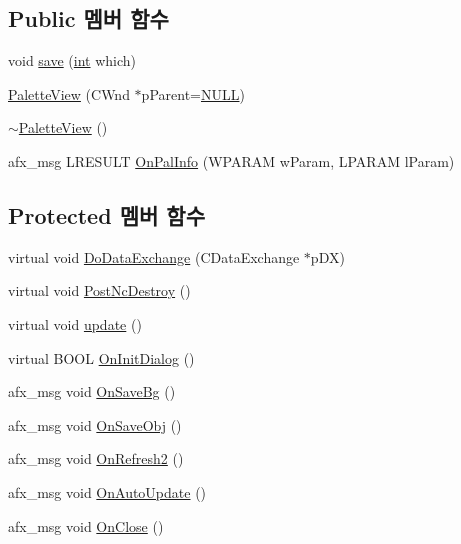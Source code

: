 \subsection*{Public 멤버 함수}
\begin{DoxyCompactItemize}
\item 
void \mbox{\hyperlink{class_palette_view_a107b71060221c9d44bdf0d38ca77c689}{save}} (\mbox{\hyperlink{_util_8cpp_a0ef32aa8672df19503a49fab2d0c8071}{int}} which)
\item 
\mbox{\hyperlink{class_palette_view_afee218ccd679f4feecc362a8c2763729}{Palette\+View}} (C\+Wnd $\ast$p\+Parent=\mbox{\hyperlink{_system_8h_a070d2ce7b6bb7e5c05602aa8c308d0c4}{N\+U\+LL}})
\item 
\mbox{\hyperlink{class_palette_view_a8b61805ccbde12bb0494801ec2b54c69}{$\sim$\+Palette\+View}} ()
\item 
afx\+\_\+msg L\+R\+E\+S\+U\+LT \mbox{\hyperlink{class_palette_view_a458786a4c3317411b5cd818c544ea50a}{On\+Pal\+Info}} (W\+P\+A\+R\+AM w\+Param, L\+P\+A\+R\+AM l\+Param)
\end{DoxyCompactItemize}
\subsection*{Protected 멤버 함수}
\begin{DoxyCompactItemize}
\item 
virtual void \mbox{\hyperlink{class_palette_view_ab6773c354d2dbf71f320a37d58889b84}{Do\+Data\+Exchange}} (C\+Data\+Exchange $\ast$p\+DX)
\item 
virtual void \mbox{\hyperlink{class_palette_view_a04d420d2e5e101622394b6da9bcd4a52}{Post\+Nc\+Destroy}} ()
\item 
virtual void \mbox{\hyperlink{class_palette_view_a94549cb400d23e790497c4263bf1e09b}{update}} ()
\item 
virtual B\+O\+OL \mbox{\hyperlink{class_palette_view_a5b6b2d948cd58f3fe450ffd7322bc9f7}{On\+Init\+Dialog}} ()
\item 
afx\+\_\+msg void \mbox{\hyperlink{class_palette_view_a4e11f19e5535efcd1b34d38899f18482}{On\+Save\+Bg}} ()
\item 
afx\+\_\+msg void \mbox{\hyperlink{class_palette_view_a1a09199a2ab1045bbbcef736d05296c1}{On\+Save\+Obj}} ()
\item 
afx\+\_\+msg void \mbox{\hyperlink{class_palette_view_ae5eaa6866be56bc87f8fe73033947c7d}{On\+Refresh2}} ()
\item 
afx\+\_\+msg void \mbox{\hyperlink{class_palette_view_a4308e6a50e6b4870432bcb90c03f3c91}{On\+Auto\+Update}} ()
\item 
afx\+\_\+msg void \mbox{\hyperlink{class_palette_view_a58ce1d32d85fc8ee06f4e97948684cea}{On\+Close}} ()
\end{DoxyCompactItemize}



